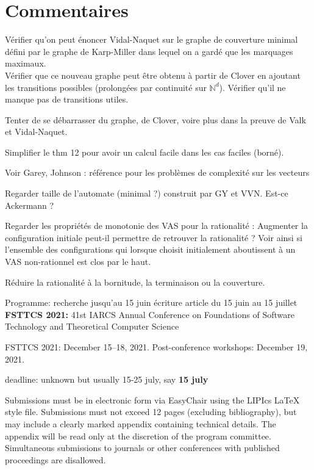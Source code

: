 \documentclass[a4paper,final]{article}
\theoremstyle{definition}
\newcommand{\N}{\ensuremath{\mathbb{N}}}
\begin{document}
\section{Commentaires}
Vérifier qu'on peut énoncer Vidal-Naquet sur le graphe de couverture minimal défini par le graphe de Karp-Miller dans lequel on a gardé que les marquages maximaux.\\
Vérifier que ce nouveau graphe peut être obtenu à partir de Clover en ajoutant les transitions possibles (prolongées par continuité sur $\N^d$). Vérifier qu'il ne manque pas de transitions utiles.

Tenter de se débarrasser du graphe, de Clover, voire plus dans la preuve de Valk et Vidal-Naquet.

Simplifier le thm 12 pour avoir un calcul facile dans les cas faciles (borné).

Voir Garey, Johnson : référence pour les problèmes de complexité sur les vecteurs

Regarder taille de l'automate (minimal ?) construit par GY et VVN. Est-ce Ackermann ?

Regarder les propriétés de monotonie des VAS pour la rationalité : 
Augmenter la configuration initiale peut-il permettre de retrouver la rationalité ?
Voir ainsi si l'ensemble des configurations qui lorsque choisit initialement aboutissent à un VAS non-rationnel est clos par le haut.

Réduire la rationalité à la bornitude, la terminaison ou la couverture.

Programme:
recherche jusqu'au 15 juin
écriture article du 15 juin au 15 juillet \\

{\bf FSTTCS 2021:}  
41st IARCS Annual Conference on
Foundations of Software Technology and Theoretical Computer Science

    FSTTCS 2021: December 15–18, 2021.
    Post-conference workshops: December 19, 2021.

deadline: unknown but usually 15-25 july, say {\bf 15 july}

Submissions must be in electronic form via EasyChair using the LIPIcs LaTeX style file. Submissions must not exceed 12 pages (excluding bibliography), but may include a clearly marked appendix containing technical details. The appendix will be read only at the discretion of the program committee. Simultaneous submissions to journals or other conferences with published proceedings are disallowed. 

\printbibliography
\end{document}
